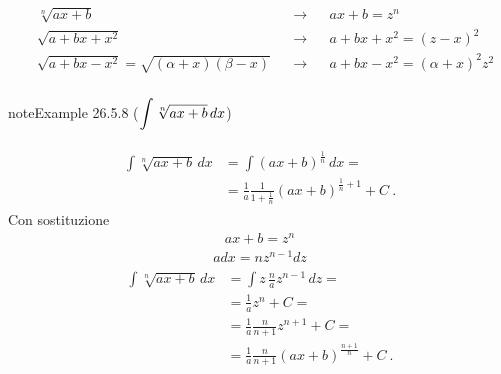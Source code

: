\documentclass[letterpaper,10pt,italian]{jupyterBook}
\begin{document}
\sphinxAtStartPar
{}
\begin{equation*}
\begin{split}\begin{aligned}
  & \sqrt[n]{ax + b}                                     && \rightarrow && ax + b = z^n \\
  & \sqrt{a + bx + x^2}                                  && \rightarrow && a + bx + x^2 = ( z - x )^2 \\
  & \sqrt{a + bx - x^2} = \sqrt{(\alpha + x)(\beta - x)} && \rightarrow && a + bx - x^2 = ( \alpha + x )^2 z^2 \\
\end{aligned}\end{split}
\end{equation*}\label{ch/infinitesimal_calculus/integrals:integrals-methods-sub-7}
\begin{sphinxadmonition}{note}{Example 26.5.8 (\protect\(\displaystyle \int \sqrt[n]{ax+b} \, dx \protect\))}



\sphinxAtStartPar
{}
\begin{equation*}
\begin{split}\begin{aligned}
  \int \sqrt[n]{ax+ b} \, dx
 & =  \int \left( ax+ b \right)^{\frac{1}{n}} \, dx = \\
 & = \frac{1}{a} \frac{1}{1+ \frac{1}{n}} (a x + b)^{\frac{1}{n}+1} + C \ .
\end{aligned}\end{split}
\end{equation*}
\sphinxAtStartPar
{} Con sostituzione
\begin{equation*}
\begin{split}a x + b = z^n\end{split}
\end{equation*}\begin{equation*}
\begin{split}a dx = n z^{n-1} dz\end{split}
\end{equation*}\begin{equation*}
\begin{split}\begin{aligned}
  \int \sqrt[n]{ax+b} \, dx
  & = \int z \, \frac{n}{a} z^{n-1} \, dz = \\
  & = \frac{1}{a} z^{n} + C = \\
  & = \frac{1}{a} \frac{n}{n+1} z^{n+1} + C = \\
  & = \frac{1}{a} \frac{n}{n+1} (ax+b)^{\frac{n+1}{n}} + C  \ .
\end{aligned}\end{split}
\end{equation*}\end{sphinxadmonition}
\end{document}
